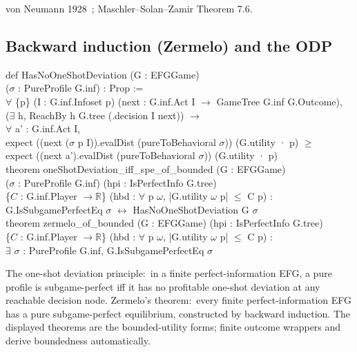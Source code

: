 \Textbook
von Neumann 1928~\citep{vN1928}; Maschler–Solan–Zamir Theorem 7.6.

\subsection{Backward induction (Zermelo) and the ODP}
\label{sec:supp:odp}\label{def:zermelo}\label{def:oneShotDeviation_iff_spe}\label{def:HasNoOneShotDeviation}

\begin{leanbox}
def HasNoOneShotDeviation (G : EFGGame)\\
\bd ($\sigma$ : PureProfile G.inf) : Prop :=\\
\bd $\forall$ \{p\} (I : G.inf.Infoset p) (next : G.inf.Act I $\to$ GameTree G.inf G.Outcome),\\
\bdd ($\exists$ h, ReachBy h G.tree (.decision I next)) $\to$\\
\bdd $\forall$ a' : G.inf.Act I,\\
\bdd \bd expect ((next ($\sigma$ p I)).evalDist (pureToBehavioral $\sigma$)) (G.utility · p) $\ge$\\
\bdd \bd expect ((next a').evalDist (pureToBehavioral $\sigma$)) (G.utility · p)\\[3pt]
theorem oneShotDeviation\_iff\_spe\_of\_bounded (G : EFGGame)\\
\bd ($\sigma$ : PureProfile G.inf) (hpi : IsPerfectInfo G.tree)\\
\bd \{$C$ : G.inf.Player $\to \mathbb{R}$\} (hbd : $\forall$ p $\omega$, |G.utility $\omega$ p| $\le$ C p) :\\
\bd G.IsSubgamePerfectEq $\sigma$ $\leftrightarrow$ HasNoOneShotDeviation G $\sigma$\\[3pt]
theorem zermelo\_of\_bounded (G : EFGGame) (hpi : IsPerfectInfo G.tree)\\
\bd \{$C$ : G.inf.Player $\to \mathbb{R}$\} (hbd : $\forall$ p $\omega$, |G.utility $\omega$ p| $\le$ C p) :\\
\bd $\exists$ $\sigma$ : PureProfile G.inf, G.IsSubgamePerfectEq $\sigma$
\end{leanbox}

\Mathematical
The one-shot deviation principle:\ in a finite perfect-information
EFG, a pure profile is subgame-perfect iff it has no profitable
one-shot deviation at any reachable decision node.  Zermelo's
theorem:\ every finite perfect-information EFG has a pure
subgame-perfect equilibrium, constructed by backward induction.
The displayed theorems are the bounded-utility forms; finite
outcome wrappers  and 
derive boundedness automatically.


